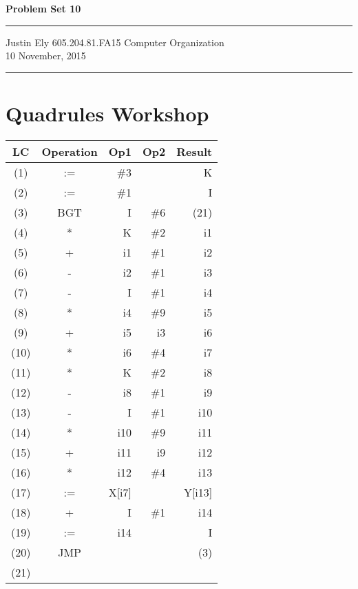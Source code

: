 \documentclass[a4paper,11pt]{article}
\begin{document}
\begin{flushright}

\vspace{1.1cm}

{\bf\Huge Problem Set 10}

\rule{0.25\linewidth}{0.5pt}

\vspace{0.5cm}
Justin Ely
\linebreak
\newline
\footnotesize{605.204.81.FA15 Computer Organization\\}
\vspace{0.5cm}
10 November, 2015
\end{flushright}

\noindent\rule{\linewidth}{1.0pt}



\section*{Quadrules Workshop}

\begin{tabular}{ | c | c | r | r | r |}
  \hline
    LC & Operation & Op1 & Op2 & Result  \\ \hline
    (1) & := & \#3 & & K \\ \hline
    (2) & := & \#1 & & I \\ \hline
    (3) & BGT & I & \#6 & (21) \\ \hline
    (4) & * & K & \#2 & i1 \\ \hline
    (5) & + & i1 & \#1 & i2 \\ \hline
    (6) & - & i2 & \#1 & i3 \\ \hline
    (7) & - &I & \#1 & i4 \\ \hline
    (8) & * & i4 & \#9 & i5 \\ \hline
    (9) & + &i5 & i3 & i6 \\ \hline
  (10) & * & i6 & \#4 & i7 \\ \hline
   (11) & * & K & \#2 & i8 \\ \hline
   (12) & - & i8 & \#1 & i9 \\ \hline
   (13) & - & I & \#1 & i10 \\ \hline
   (14) & * & i10 & \#9 & i11 \\ \hline
   (15) & + & i11 & i9 & i12 \\ \hline
   (16) & * & i12 & \#4 & i13 \\ \hline
   (17) & := & X[i7] &   & Y[i13] \\ \hline
   (18) & + & I & \#1 & i14 \\ \hline
   (19) & := & i14 &  & I \\ \hline
   (20) & JMP &  &  & (3) \\ \hline
   (21) &   &   &   &  \\ \hline
\end{tabular}
\end{document}
